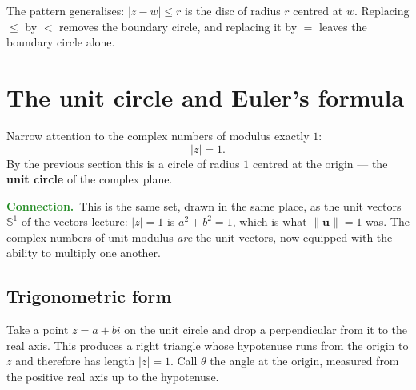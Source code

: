 \documentclass[11pt]{article}
\theoremstyle{definition}
\theoremstyle{remark}
\newcommand{\lookback}{\par\smallskip\noindent
  \textbf{\sffamily\textcolor{ForestGreen}{Connection.}}\ \ignorespaces}
\newcommand{\Sph}[1]{\mathbb{S}^{#1}}
\newcommand{\vc}[1]{\mathbf{#1}}
\newcommand{\norm}[1]{\lVert #1\rVert}
\newcommand{\Rez}{\operatorname{Re}}
\newcommand{\Imz}{\operatorname{Im}}
\newcommand{\cplane}[4]{%
  \draw[step=1cm,gray!25,very thin] (#1,#3) grid (#2,#4);
  \draw[axisline] (#1,0) -- (#2+0.55,0)
        node[right,font=\scriptsize,black]{$\Rez$};
  \draw[axisline] (0,#3) -- (0,#4+0.55)
        node[above,font=\scriptsize,black]{$\Imz$};
}
\newcommand{\cpoint}[5]{%
  \fill[#3] (#1,#2) circle (2.1pt);
  \node[#5,font=\scriptsize,#3] at (#1,#2) {#4};
}
\begin{document}
\noindent The pattern generalises: $\lvert z-w\rvert\le r$ is the disc of radius
$r$ centred at $w$. Replacing $\le$ by $<$ removes the boundary circle, and
replacing it by $=$ leaves the boundary circle alone.

\begin{center}
\hspace{1.4cm}
\end{center}

\section{The unit circle and Euler's formula}
Narrow attention to the complex numbers of modulus exactly $1$:
\[
  \lvert z\rvert = 1 .
\]
By the previous section this is a circle of radius $1$ centred at the origin ---
the \textbf{unit circle} of the complex plane.

\lookback This is the same set, drawn in the same place, as the unit vectors
$\Sph{1}$ of the vectors lecture: $\lvert z\rvert=1$ is $a^{2}+b^{2}=1$, which
is what $\norm{\vc{u}}=1$ was. The complex numbers of unit modulus \emph{are}
the unit vectors, now equipped with the ability to multiply one another.

\subsection{Trigonometric form}
Take a point $z=a+bi$ on the unit circle and drop a perpendicular from it to the
real axis. This produces a right triangle whose hypotenuse runs from the origin
to $z$ and therefore has length $\lvert z\rvert=1$. Call $\theta$ the angle at
the origin, measured from the positive real axis up to the hypotenuse.
\end{document}
